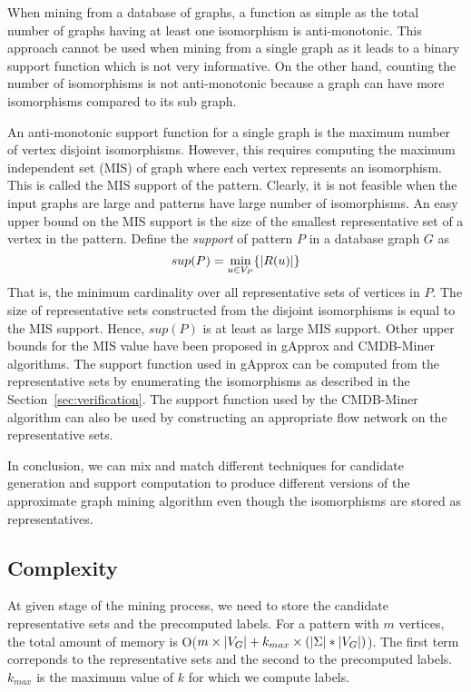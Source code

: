 When mining from a database of graphs, a function as simple as the total number
of graphs having at least one isomorphism is anti-monotonic. This approach cannot
be used when mining from a single graph as it leads to a binary support function
which is not very informative. On the other hand, counting the number of
isomorphisms is not anti-monotonic because a graph can have more isomorphisms
compared to its sub graph.

An anti-monotonic support function for a single graph is the maximum number of
vertex disjoint isomorphisms. However, this requires computing the maximum
independent set (MIS) of graph where each vertex represents an isomorphism.
This is called the MIS support of the pattern.
Clearly, it is not feasible when the input graphs are large and patterns have
large number of isomorphisms. An easy upper bound on the MIS support is the size
of the smallest representative set of a vertex in the pattern.  Define the {\em
support} of pattern $P$ in a database graph $G$ as $$sup(P) = \min_{u \in V_P}
\{ |R(u)| \}$$ That is, the minimum cardinality over all representative sets of
vertices in $P$.  The size of representative sets constructed from the disjoint
isomorphisms is equal to the MIS support. Hence, $sup(P)$ is at least as large
MIS support.  Other upper bounds for the MIS value have been proposed in gApprox
and CMDB-Miner algorithms. The support function used in gApprox can be computed
from the representative sets by enumerating the isomorphisms as described in the
Section~\ref{sec:verification}.  The support function used by the CMDB-Miner
algorithm can also be used by constructing an appropriate flow network on the
representative sets.

In conclusion, we can mix and match different techniques for candidate
generation and support computation to produce different versions of the
approximate graph mining algorithm even though the isomorphisms are stored as
representatives.

\subsection{Complexity}
 At given stage of the mining process,
we need to store the candidate representative sets and the precomputed 
\khop labels. For a pattern with $m$ vertices, the total amount of memory
is O($m \times |V_G| + k_{max} \times ( |\Sigma| * |V_G|)$). The first term
correponds to the representative sets and the second to the precomputed
\khop labels. $k_{max}$ is the maximum value of $k$ for which we compute \khop
labels.

